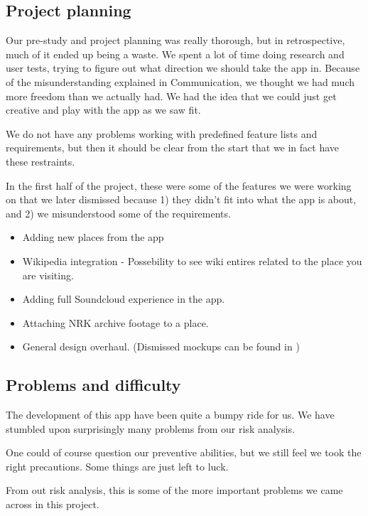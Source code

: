 	\subsection{Project planning}


Our pre-study and project planning was really thorough, but in retrospective, much of it ended up being a waste. We spent a lot of time doing research and user tests, trying to figure out what direction we should take the app in. Because of the misunderstanding explained in Communication, we thought we had much more freedom than we actually had. We had the idea that we could just get creative and play with the app as we saw fit.

We do not have any problems working with predefined feature lists and requirements, but then it should be clear from the start that we in fact have these restraints.

In the first half of the project, these were some of the features we were working on that we later dismissed because 1) they didn't fit into what the app is about, and 2) we misunderstood some of the requirements.

\begin{itemize}
	\item Adding new places from the app
	\item Wikipedia integration - Possebility to see wiki entires related to the place you are visiting.
	\item Adding full Soundcloud experience in the app.
	\item Attaching NRK archive footage to a place. 
	\item General design overhaul.  (Dismissed mockups can be found in )
\end{itemize}

	\subsection{Problems and difficulty}

The development of this app have been quite a bumpy ride for us. We have stumbled upon surprisingly many problems from our risk analysis.

One could of course question our preventive abilities, but we still feel we took the right precautions. Some things are just left to luck.

From out risk analysis, this is some of the more important problems we came across in this project. 

